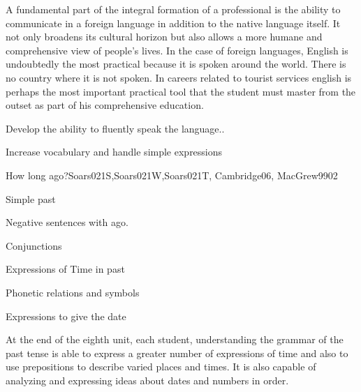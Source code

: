 \begin{syllabus}


\begin{justification}
A fundamental part of the integral formation of a professional is the ability to communicate in a foreign language in addition to the native language itself. It not only broadens its cultural horizon but also allows a more humane and comprehensive view of people's lives. In the case of foreign languages, English is undoubtedly the most practical because it is spoken around the world. There is no country where it is not spoken.
In careers related to tourist services english is perhaps the most important practical tool that the student must master from the outset as part of his comprehensive education.
\end{justification}

\begin{goals}
\item Develop the ability to fluently speak the language..
\item Increase vocabulary and handle simple expressions
\end{goals}

\begin{competences}
    \item {}
\end{competences}

\begin{outcomes}
\item {}
\item {}
\end{outcomes}

\begin{unit}{How long ago?}{}{Soars021S,Soars021W,Soars021T, Cambridge06, MacGrew99}{0}{2}
   \begin{topics}
      \item Simple past
      \item Negative sentences with ago.
      \item Conjunctions
      \item Expressions of Time in past
      \item Phonetic relations and symbols
      \item Expressions to give the date
   \end{topics}

   \begin{learningoutcomes}
      \item At the end of the eighth unit, each student, understanding the grammar of the past tense is able to express a greater number of expressions of time and also to use prepositions to describe varied places and times. It is also capable of analyzing and expressing ideas about dates and numbers in order. 
   \end{learningoutcomes}


\end{unit}
\end{syllabus}
